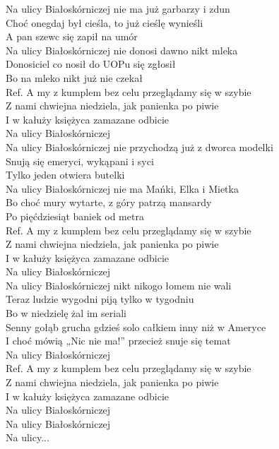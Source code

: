 
Na ulicy Białoskórniczej nie ma już garbarzy i zdun  \\
Choć onegdaj był cieśla, to już cieślę wynieśli \tab{}  \\
A pan szewc się zapił na umór \tab{} \tab{}\\
\hops
Na ulicy Białoskórniczej nie donosi dawno nikt mleka  \\
Donosiciel co nosił do UOPu się zgłosił \tab{} \\
Bo na mleko nikt już nie czekał   \tab{} \\
\hops
Ref. A my z kumplem bez celu przeglądamy się w szybie \\
 Z nami chwiejna niedziela, jak panienka po piwie  \\
 I w kałuży księżyca zamazane odbicie\tab{}  \\
 Na ulicy Białoskórniczej\tab{} \tab{}\\
\hops
Na ulicy Białoskórniczej nie przychodzą już z dworca modelki \\
Snują się emeryci, wykąpani i syci \\
Tylko jeden otwiera butelki \\
\hops
Na ulicy Białoskórniczej nie ma Mańki, Elka i Mietka \\
Bo choć mury wytarte, z góry patrzą mansardy \\
Po pięćdziesiąt baniek od metra \\
\hops
Ref. A my z kumplem bez celu przeglądamy się w szybie\\
 Z nami chwiejna niedziela, jak panienka po piwie \\
 I w kałuży księżyca zamazane odbicie \\
 Na ulicy Białoskórniczej \\
\hops
Na ulicy Białoskórniczej nikt nikogo łomem nie wali \\
Teraz ludzie wygodni piją tylko w tygodniu \\
Bo w niedzielę żal im seriali \\
\hops
Senny gołąb grucha gdzieś solo całkiem inny niż w Ameryce \\
I choć mówią „Nic nie ma!”  przecież snuje się temat \\
Na ulicy Białoskórniczej \\
\hops
Ref. A my z kumplem bez celu przeglądamy się w szybie\\
 Z nami chwiejna niedziela, jak panienka po piwie \\
 I w kałuży księżyca zamazane odbicie \\
 Na ulicy Białoskórniczej \\
 Na ulicy Białoskórniczej \\
 Na ulicy...